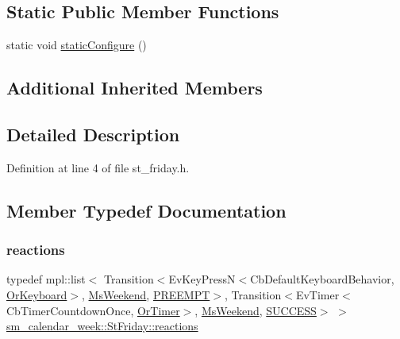 \subsection*{Static Public Member Functions}
\begin{DoxyCompactItemize}
\item 
static void \hyperlink{structsm__calendar__week_1_1StFriday_a887ff28737ceb01b3540a1295bd75bb0}{static\+Configure} ()
\end{DoxyCompactItemize}
\subsection*{Additional Inherited Members}


\subsection{Detailed Description}


Definition at line 4 of file st\+\_\+friday.\+h.



\subsection{Member Typedef Documentation}
\mbox{\label{structsm__calendar__week_1_1StFriday_a3086092f43c6f0426130aa46b55edaab}} 
\subsubsection{\texorpdfstring{reactions}{reactions}}
{\footnotesize\ttfamily typedef mpl\+::list$<$ Transition$<$Ev\+Key\+PressN$<$Cb\+Default\+Keyboard\+Behavior, \hyperlink{classsm__calendar__week_1_1OrKeyboard}{Or\+Keyboard}$>$, \hyperlink{classsm__calendar__week_1_1MsWeekend}{Ms\+Weekend}, \hyperlink{classPREEMPT}{P\+R\+E\+E\+M\+PT}$>$, Transition$<$Ev\+Timer$<$Cb\+Timer\+Countdown\+Once, \hyperlink{classsm__calendar__week_1_1OrTimer}{Or\+Timer}$>$, \hyperlink{classsm__calendar__week_1_1MsWeekend}{Ms\+Weekend}, \hyperlink{classSUCCESS}{S\+U\+C\+C\+E\+SS}$>$ $>$ \hyperlink{structsm__calendar__week_1_1StFriday_a3086092f43c6f0426130aa46b55edaab}{sm\+\_\+calendar\+\_\+week\+::\+St\+Friday\+::reactions}}



